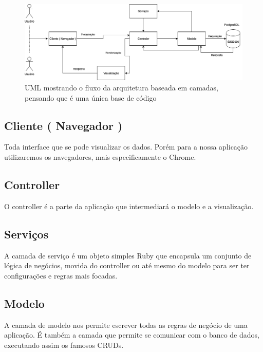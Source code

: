 \begin{figure}[htbp]
\hypertarget{arquitetura}{%
\caption{UML mostrando o fluxo da arquitetura baseada em camadas, pensando que é uma única base de código}
\begin{center}
\includegraphics[width=15cm]{Monografia-FormatoLatex/Imagens/ArquiteturaEmCamadas.png}
\end{center}
}
\label{fig:arquitetura-fluxograma}
\end{figure}

\subsection{Cliente ( Navegador )}

Toda interface que se pode visualizar os dados. Porém para a nossa aplicação utilizaremos os navegadores, mais especificamente o Chrome.

\subsection{Controller}

O controller é a parte da aplicação que intermediará o modelo e a visualização.

\subsection{Serviços}

A camada de serviço é um objeto simples Ruby que encapsula um conjunto de lógica de negócios, movida do controller ou até mesmo do modelo para ser ter configurações e regras mais focadas.

\subsection{Modelo}
A camada de modelo nos permite escrever todas as regras de negócio de uma aplicação. É também a camada que permite se comunicar com o banco de dados, executando assim os famosos CRUDs.

